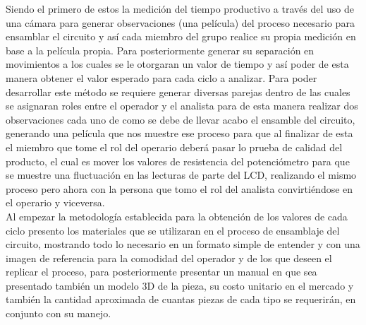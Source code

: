         Siendo el primero de estos la medición del tiempo productivo a través del uso de una cámara para generar observaciones (una película) del proceso necesario para ensamblar el circuito y así cada miembro del grupo realice su propia medición en base a la película propia. Para posteriormente generar su separación en movimientos a los cuales se le otorgaran un valor de tiempo y así poder de esta manera obtener el valor esperado para cada ciclo a analizar. 
        Para poder desarrollar este método se requiere generar diversas parejas dentro de las cuales se asignaran roles entre el operador y el analista para de esta manera realizar dos observaciones cada uno de como se debe de llevar acabo el ensamble del circuito, generando una película que nos muestre ese proceso para que al finalizar de esta el miembro que tome el rol del operario deberá pasar lo prueba de calidad del producto, el cual es mover los valores de resistencia del potenciómetro para que se muestre una fluctuación en las lecturas de parte del LCD, realizando el mismo proceso pero ahora con la persona que tomo el rol del analista convirtiéndose en el operario y viceversa.
        \\Al empezar la metodología establecida para la obtención de los valores de cada ciclo presento los materiales que se utilizaran en el proceso de ensamblaje del circuito, mostrando todo lo necesario en un formato simple de entender y con una imagen de referencia para la comodidad del operador y de los que deseen el replicar el proceso, para posteriormente presentar un manual en que sea presentado también un modelo 3D de la pieza, su costo unitario en el mercado y también la cantidad aproximada de cuantas piezas de cada tipo se requerirán, en conjunto con su manejo.
    
